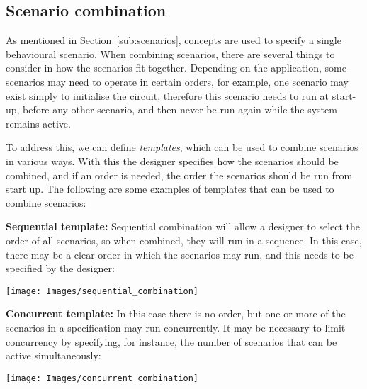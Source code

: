 \documentclass[british, journal]{IEEEtran}
\begin{document}
\vspace{-1mm}
\subsection{Scenario combination\label{sub:scenario-composition}}

As mentioned in Section~\ref{sub:scenarios}, concepts are used to specify
a single behavioural scenario.
When combining scenarios, there are several things to consider in
how the scenarios fit together. Depending on the application,
some scenarios may need to operate in certain
orders, for example, one scenario may exist simply to initialise the
circuit, therefore this scenario needs to run at start-up, before
any other scenario, and then never be run again while the
system remains active.

To address this, we can define \emph{templates},
which can be used to combine scenarios in various ways.
With this the designer specifies how the scenarios should
be combined, and if an order is needed, the order the scenarios should
be run from start up. The following are some examples of templates
that can be used to combine scenarios:

\textbf{Sequential template:} Sequential combination will allow a designer
to select the order of all scenarios, so when combined, they will
run in a sequence. In this case, there may be a clear order in which
the scenarios may run, and this needs to be specified by the designer:

\vspace{-2mm}
\begin{center}
\texttt{[image: Images/sequential\_combination]}
\end{center}

\textbf{Concurrent template:} In this case there is no order, but one or more
of the scenarios in a specification may run concurrently. It may be necessary
to limit concurrency by specifying, for instance, the number of scenarios
that can be active simultaneously:

\vspace{-2mm}
\begin{center}
\texttt{[image: Images/concurrent\_combination]}
\end{center}
\end{document}
